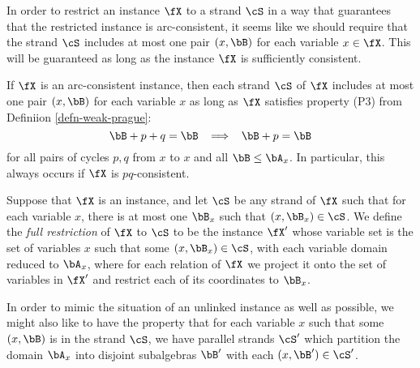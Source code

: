 In order to restrict an instance $\fX$ to a strand $\cS$ in a way that guarantees that the restricted instance is arc-consistent, it seems like we should require that the strand $\cS$ includes at most one pair $(x,\bB)$ for each variable $x \in \fX$. This will be guaranteed as long as the instance $\fX$ is sufficiently consistent.

\begin{prop} If $\fX$ is an arc-consistent instance, then each strand $\cS$ of $\fX$ includes at most one pair $(x,\bB)$ for each variable $x$ as long as $\fX$ satisfies property (P3) from Definiion \ref{defn-weak-prague}:
\[
\bB + p + q = \bB \;\; \implies \;\; \bB + p = \bB
\]
for all pairs of cycles $p,q$ from $x$ to $x$ and all $\bB \le \bA_x$. In particular, this always occurs if $\fX$ is $pq$-consistent.
\end{prop}

\begin{defn} Suppose that $\fX$ is an instance, and let $\cS$ be any strand of $\fX$ such that for each variable $x$, there is at most one $\bB_x$ such that $(x,\bB_x) \in \cS$. We define the \emph{full restriction} of $\fX$ to $\cS$ to be the instance $\fX'$ whose variable set is the set of variables $x$ such that some $(x,\bB_x) \in \cS$, with each variable domain reduced to $\bA_x$, where for each relation of $\fX$ we project it onto the set of variables in $\fX'$ and restrict each of its coordinates to $\bB_x$.
\end{defn}

In order to mimic the situation of an unlinked instance as well as possible, we might also like to have the property that for each variable $x$ such that some $(x,\bB)$ is in the strand $\cS$, we have parallel strands $\cS'$ which partition the domain $\bA_x$ into disjoint subalgebras $\bB'$ with each $(x,\bB') \in \cS'$.


